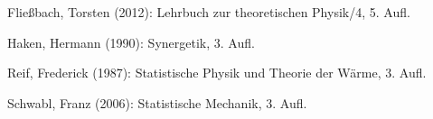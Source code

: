\documentclass[ngerman]{article}
\begin{document}
\begin{thebibliography}{4}
 Fließbach, Torsten (2012):
Lehrbuch zur theoretischen Physik/4, 5. Aufl.

Haken, Hermann (1990):
Synergetik, 3. Aufl.

Reif, Frederick (1987):
Statistische Physik und Theorie der Wärme, 3. Aufl.

 Schwabl, Franz (2006):
Statistische Mechanik, 3. Aufl.




\end{thebibliography}
 
\end{document}
